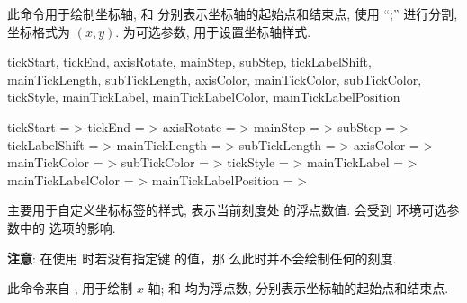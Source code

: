 \documentclass[
  hyper, lang=cn, 
  class=l3dox, 
]{../../zlatex/code/ztex}
\begin{document}
\begin{function}[added=2025-05-15]{\ShowAxis}
  \begin{syntax}
  \end{syntax}
  此命令用于绘制坐标轴,  和  分别表示坐标轴的起始点和结束点, 
  使用 ``;'' 进行分割, 坐标格式为 $(x, y)$.  为可选参数, 用于设置坐标轴样式.
\end{function}


\begin{keyval}[parent=ztikz/axis]
  {tickStart, tickEnd, axisRotate, mainStep, subStep, 
  tickLabelShift, mainTickLength, subTickLength,
  axisColor, mainTickColor, subTickColor, tickStyle,
  mainTickLabel, mainTickLabelColor, mainTickLabelPosition}
  \begin{syntax}
    tickStart       = >
    tickEnd         = >
    axisRotate      = >
    mainStep        = >
    subStep         = >
    tickLabelShift  = >\dval{0pt}
    mainTickLength  = >\dval{4pt}
    subTickLength   = >\dval{2pt}
    axisColor       = >
    mainTickColor   = >
    subTickColor    = >
    tickStyle       = >
    mainTickLabel   = >
    mainTickLabelColor    = >
    mainTickLabelPosition = >
  \end{syntax}
   主要用于自定义坐标标签的样式,  表示当前刻度处
  的浮点数值.  会受到  环境可选参数中的  
  选项的影响.\par \textbf{注意}: 在使用  时若没有指定键  的值，那
  么此时并不会绘制任何的刻度.
\end{keyval}



\begin{function}[added=2025-05-15]{\xAxis}
  \begin{syntax}
  \end{syntax}
  此命令来自 , 用于绘制 $x$ 轴;  和  均为浮点数, 分别表示坐标轴的起始点和结束点.
\end{function}
\end{document}
